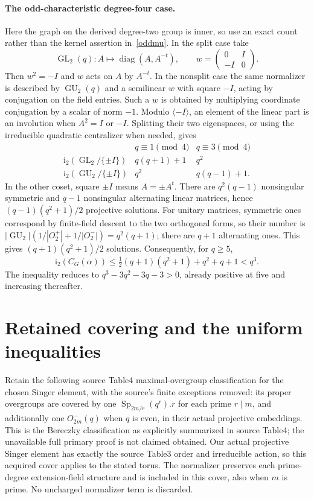 \documentclass[10pt]{article}
\newcommand{\ii}{\mathrm i_2}\newcommand{\nuu}{\nu_2}\newcommand{\F}{\mathbb F}\newcommand{\GL}{\operatorname{GL}}\newcommand{\GU}{\operatorname{GU}}\newcommand{\Sp}{\operatorname{Sp}}\newcommand{\PSp}{\operatorname{PSp}}\newcommand{\PGSp}{\operatorname{PGSp}}\newcommand{\Aut}{\operatorname{Aut}}
\begin{document}
\paragraph{The odd-characteristic degree-four case.}
Here the graph on the derived degree-two group is inner, so use an exact
count rather than the kernel assertion in~\eqref{oddmu}. In the split
case take
\[
 \GL_2(q): A\mapsto\operatorname{diag}(A,A^{-t}),\qquad
 w=\begin{pmatrix}0&I\\-I&0\end{pmatrix}.
\]
Then $w^2=-I$ and $w$ acts on $A$ by $A^{-t}$. In the nonsplit case the
same normalizer is described by $\GU_2(q)$ and a semilinear $w$ with square
$-I$, acting by conjugation on the field entries. Such a $w$ is obtained
by multiplying coordinate conjugation by a scalar of norm $-1$.
Modulo $\langle-I\rangle$, an element of the linear part is an involution
when $A^2=I$ or $-I$. Splitting their two eigenspaces, or using the
irreducible quadratic centralizer when needed, gives
\[
\begin{array}{c|cc}
& q\equiv1\pmod4&q\equiv3\pmod4\\\hline
\ii(\GL_2/\{\pm I\})&q(q+1)+1&q^2\\
\ii(\GU_2/\{\pm I\})&q^2&q(q-1)+1.
\end{array}
\]
In the other coset, square $\pm I$ means $A=\pm A^t$.
There are $q^2(q-1)$ nonsingular symmetric and $q-1$ nonsingular alternating
linear matrices, hence $(q-1)(q^2+1)/2$ projective solutions. For unitary
matrices, symmetric ones correspond by finite-field descent to the two
orthogonal forms, so their number is
$|\GU_2|(1/|O_2^+|+1/|O_2^-|)=q^2(q+1)$; there are $q+1$ alternating
ones. This gives $(q+1)(q^2+1)/2$ solutions. Consequently, for $q\ge5$,
\begin{equation}\label{mu4odd}
 \ii(C_G(\alpha))\le\tfrac12(q+1)(q^2+1)+q^2+q+1<q^3.
\end{equation}
The inequality reduces to $q^3-3q^2-3q-3>0$, already positive at five
and increasing thereafter.

\section{Retained covering and the uniform inequalities}
Retain the following source Table4 maximal-overgroup classification for the
chosen Singer element, with the source's finite exceptions removed:
its proper overgroups are covered by one
$\Sp_{2m/r}(q^r).r$ for each prime $r\mid m$, and additionally one
$O^-_{2m}(q)$ when $q$ is even, in their actual projective embeddings.
This is the Bereczky classification as explicitly summarized in source
Table4; the unavailable full primary proof is not claimed obtained.
Our actual projective Singer element has exactly the source Table3 order
and irreducible action, so this acquired cover applies to the stated torus.
The normalizer preserves each prime-degree extension-field structure and
is included in this cover, also when $m$ is prime. No uncharged normalizer
term is discarded.
\end{document}
